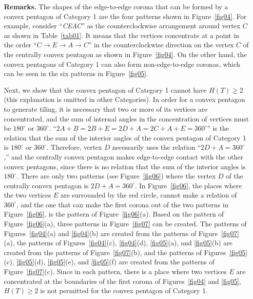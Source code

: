 \documentclass[11pt, a4paper]{article}
\begin{document}
\noindent
\textbf{Remarks. }
The shapes of the edge-to-edge corona that can be formed 
by a convex pentagon of Category 1 are the four patterns shown in Figure~\ref{fig04}. 
For example, consider ``\textit{CEAC}'' as the counterclockwise arrangement around 
vertex $C$ as shown in Table~\ref{tab01}. It means that the vertices concentrate at 
a point in the order ``$C \to E \to A \to C$'' in the counterclockwise direction on 
the vertex $C$ of the centrally convex pentagon as shown in Figure~\ref{fig04}. On 
the other hand, the convex pentagons of Category 1 can also form non-edge-to-edge 
coronas, which can be seen in the six patterns in Figure~\ref{fig05}.

Next, we show that the convex pentagon of Category 1 cannot have 
$H(T) \geq 2$ (this explanation is omitted in other Categories). In order 
for a convex pentagon to generate tiling, it is necessary that two or more of its 
vertices are concentrated, and the sum of internal angles in the concentration 
of vertices must be $180^ \circ$ or $360^ \circ$. ``$2A+B = 2B+E = 2D+A = 
2C+A+E = 360^ \circ$'' is the relation that the sum of the interior angles of the 
convex pentagon of Category 1 is $180^ \circ$ or $360^ \circ$. Therefore, 
vertex $D$ necessarily uses the relation ``$2D+A = 360^ \circ$,'' and the 
centrally convex pentagon makes edge-to-edge contact with the other convex 
pentagons, since there is no relation that the sum of the interior angles is 
$180^ \circ$. There are only two patterns (see Figure~\ref{fig06}) where the 
vertex $D$ of the centrally convex pentagon is $2D+A = 360^ \circ$. 
In Figure~\ref{fig06}, the places where the two vertices $E$ are surrounded 
by the red circle, cannot make a relation of $360^ \circ$, and the one that 
can make the first corona out of the two patterns in Figure~\ref{fig06}, 
is the pattern of Figure~\ref{fig06}(a). Based on the pattern of Figure~\ref{fig06}(a), 
three patterns in Figure~\ref{fig07} can be created. The patterns of 
Figures~\ref{fig04}(a) and \ref{fig04}(b) are created from the patterns of 
Figure~\ref{fig07}(a), the patterns of Figures~\ref{fig04}(c), \ref{fig04}(d), 
\ref{fig05}(a), and \ref{fig05}(b) are created from the patterns of 
Figure~\ref{fig07}(b), and the patterns of Figures~\ref{fig05}(c), \ref{fig05}(d), 
\ref{fig05}(e), and \ref{fig05}(f) are created from the patterns 
of Figure~\ref{fig07}(c). Since in each pattern, there is a place where two vertices 
$E$ are concentrated at the boundaries of the first corona of Figures~\ref{fig04} 
and \ref{fig05}, $H(T) \geq 2 $ is not permitted for the convex pentagon of Category 1.
\end{document}
